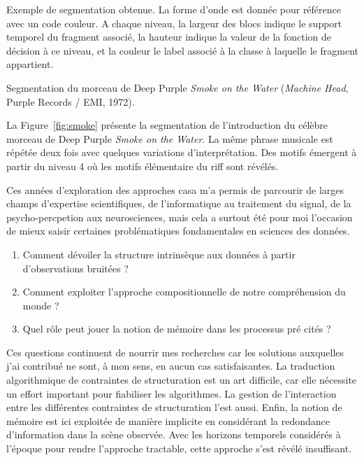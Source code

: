 \label{fig:alcsample}

Exemple de segmentation obtenue. La forme d'onde est donnée pour référence avec un code couleur. A chaque niveau, la largeur des blocs indique le support temporel du fragment associé, la hauteur indique la valeur de la fonction de décision à ce niveau, et la couleur le label associé à la classe à laquelle le fragment appartient.

Segmentation du morceau de Deep Purple \emph{Smoke on the Water} (\emph{Machine Head}, Purple Records / EMI, 1972).

La Figure~\ref{fig:smoke} présente la segmentation de l'introduction du célèbre morceau de
Deep Purple \emph{Smoke on the Water}. La même phrase musicale est répétée deux fois avec quelques variations d'interprétation. Des motifs émergent à partir du niveau 4 où les motifs élémentaire du riff sont révélés.

Ces années d'exploration des approches casa m'a permis de parcourir de larges champs d'expertise scientifiques, de l'informatique au traitement du signal, de la psycho-percpetion aux neurosciences, mais cela a surtout été pour moi l'occasion de mieux saisir certaines problématiques fondamentales en sciences des données.
\begin{enumerate}
  \item Comment dévoiler la structure intrinsèque aux données à partir d'observations bruitées ?
  \item Comment exploiter l'approche compositionnelle de notre compréhension du monde ?
  \item Quel rôle peut jouer la notion de mémoire dans les processus pré cités ?
\end{enumerate}
Ces questions continuent de nourrir mes recherches car les solutions auxquelles j'ai contribué ne sont, à mon sens, en aucun cas satisfaisantes. La traduction algorithmique de contraintes de structuration est un art difficile, car elle nécessite un effort important pour fiabiliser les algorithmes. La gestion de l'interaction entre les différentes contraintes de structuration l'est aussi. Enfin, la notion de mémoire est ici exploitée de manière implicite en considérant la redondance d'information dans la scène observée. Avec les horizons temporels considérés à l'époque pour rendre l'approche tractable, cette approche s'est révélé insuffisant.  %

